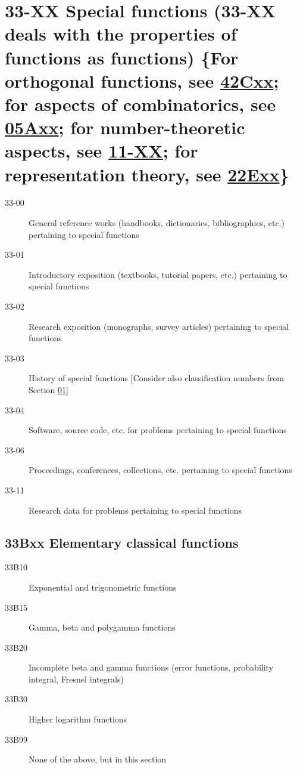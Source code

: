 \section*{33-XX Special functions (33-XX deals with the properties of functions as functions) \{For orthogonal functions, see \hyperref[42Cxx]{42Cxx}; for aspects of combinatorics, see \hyperref[05Axx]{05Axx}; for number-theoretic aspects, see \hyperref[11-XX]{11-XX}; for representation theory, see \hyperref[22Exx]{22Exx}\} }\label{33-XX}
\begin{description}
\item [33-00]\label{33-00} General reference works (handbooks, dictionaries, bibliographies, etc.) pertaining to special functions
\item [33-01]\label{33-01} Introductory exposition (textbooks, tutorial papers, etc.) pertaining to special functions
\item [33-02]\label{33-02} Research exposition (monographs, survey articles) pertaining to special functions
\item [33-03]\label{33-03} History of special functions [Consider also classification numbers from Section \hyperref[01-XX]{01}]
\item [33-04]\label{33-04} Software, source code, etc. for problems pertaining to special functions
\item [33-06]\label{33-06} Proceedings, conferences, collections, etc. pertaining to special functions
\item [33-11]\label{33-11} Research data for problems pertaining to special functions
\end{description}
\subsection*{33Bxx  Elementary classical functions }\label{33Bxx}
\begin{description}  
\item [33B10]\label{33B10} Exponential and trigonometric functions
\item [33B15]\label{33B15} Gamma, beta and polygamma functions
\item [33B20]\label{33B20} Incomplete beta and gamma functions (error functions, probability integral, Fresnel integrals)
\item [33B30]\label{33B30} Higher logarithm functions
\item [33B99]\label{33B99} None of the above, but in this section
\end{description}
